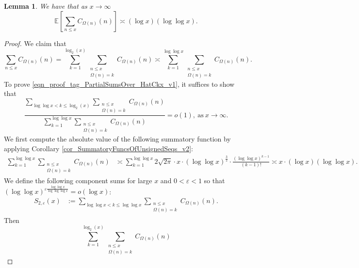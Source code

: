 \documentclass[11pt,reqno,a4letter]{article}
\numberwithin{figure}{section}
\numberwithin{table}{section}
\theoremstyle{plain}
\newtheorem{lemma}[theorem]{Lemma}
\numberwithin{theorem}{section}
\theoremstyle{definition}
\begin{document}
\begin{lemma} 
\label{lemma_HatCAstxSum_ExactFormulaWithError_v1} 
We have that as $x \rightarrow \infty$ 
\[
\mathbb{E}\left[\sum_{n \leq x} C_{\Omega(n)}(n)\right] \asymp (\log x) (\log\log x). 
\] 
\end{lemma} 
\begin{proof} 
We claim that 
\begin{equation} 
\label{eqn_proof_tag_PartialSumsOver_HatCkx_v1} 
\sum_{n \leq x} C_{\Omega(n)}(n) = 
     \sum_{k=1}^{\log_2(x)} \sum_{\substack{n \leq x \\ \Omega(n) = k}} C_{\Omega(n)}(n) \asymp 
     \sum_{k=1}^{\log\log x} \sum_{\substack{n \leq x \\ \Omega(n) = k}} C_{\Omega(n)}(n). 
\end{equation} 
To prove \eqref{eqn_proof_tag_PartialSumsOver_HatCkx_v1}, it suffices to show that 
\begin{equation} 
\label{eqn_proof_tag_PartialSumsOver_HatCkx_EquivCond_v2} 
\frac{\sum\limits_{\log\log x < k \leq \log_2(x)} \sum\limits_{\substack{n \leq x \\ \Omega(n) = k}} C_{\Omega(n)}(n)}{ 
     \sum\limits_{k=1}^{\log\log x} \sum\limits_{\substack{n \leq x \\ \Omega(n) = k}} C_{\Omega(n)}(n)} = o(1), 
     \mathrm{\ as\ } x \rightarrow \infty. 
\end{equation} 
We first compute the absolute value of the following 
summatory function by applying 
Corollary \ref{cor_SummatoryFuncsOfUnsignedSeqs_v2}:
\begin{align} 
\label{eqn_proof_tag_PartialSumsOver_HatCkx_v3} 
\sum_{k=1}^{\log\log x} \sum_{\substack{n \leq x \\ \Omega(n) = k}} C_{\Omega(n)}(n) & \asymp 
     \sum_{k=1}^{\log\log x} 2\sqrt{2\pi} \cdot x \cdot (\log\log x)^{\frac{3}{2}} \cdot 
     \frac{(\log\log x)^{k-1}}{(k-1)!} 
     \asymp x \cdot (\log x) (\log\log x). 
\end{align} 
We define the following component sums for large $x$ and $0 < \varepsilon < 1$ so that 
$(\log\log x)^{\varepsilon \frac{\log\log x}{\log\log\log x}} = o(\log x)$: 
\begin{align*} 
S_{2,\varepsilon}(x) & := \sum_{\log\log x < k \leq \log\log x} \sum_{\substack{n \leq x \\ \Omega(n) = k}} C_{\Omega(n)}(n). 
\end{align*} 
Then 
\[
\sum_{k=1}^{\log_2(x)} \sum_{\substack{n \leq x \\ \Omega(n) = k}} C_{\Omega(n)}(n) 
\]
\end{proof}
\end{document}

